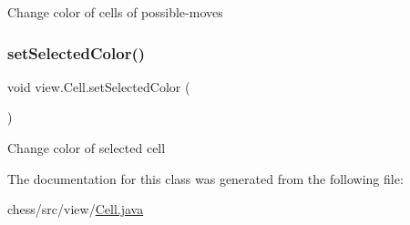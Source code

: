Change color of cells of possible-\/moves \mbox{\label{classview_1_1_cell_a3c85b10fac6cfb0583903f13376c9ec4}} 
\subsubsection{\texorpdfstring{setSelectedColor()}{setSelectedColor()}}
{\footnotesize\ttfamily void view.\+Cell.\+set\+Selected\+Color (\begin{DoxyParamCaption}{ }\end{DoxyParamCaption})\hspace{0.3cm}{\ttfamily [inline]}}

Change color of selected cell 

The documentation for this class was generated from the following file\+:\begin{DoxyCompactItemize}
\item 
chess/src/view/\mbox{\hyperlink{_cell_8java}{Cell.\+java}}\end{DoxyCompactItemize}
